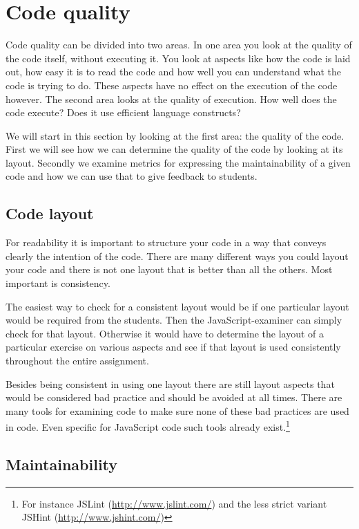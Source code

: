 \documentclass{article}
\begin{document}
\section{Code quality}

Code quality can be divided into two areas. In one area you look at the quality
of the code itself, without executing it. You look at aspects like how the code
is laid out, how easy it is to read the code and how well you can understand
what the code is trying to do. These aspects have no effect on the execution of
the code however. The second area looks at the quality of execution. How well
does the code execute? Does it use efficient language constructs?

We will start in this section by looking at the first area: the quality of the
code. First we will see how we can determine the quality of the code by looking
at its layout. Secondly we examine metrics for expressing the maintainability
of a given code and how we can use that to give feedback to students.

\subsection{Code layout}

For readability it is important to structure your code in a way that conveys clearly the intention of the code. There are many different ways you could layout your code and there is not one layout that is better than all the others. Most important is consistency.

The easiest way to check for a consistent layout would be if one particular layout would be required from the students. Then the JavaScript-examiner can simply check for that layout. Otherwise it would have to determine the layout of a particular exercise on various aspects and see if that layout is used consistently throughout the entire assignment.

Besides being consistent in using one layout there are still layout aspects
that would be considered bad practice and should be avoided at all times. There
are many tools for examining code to make sure none of these bad practices are
used in code. Even specific for JavaScript code such tools already
exist.\footnote{For instance JSLint (\url{http://www.jslint.com/}) and the less
strict variant JSHint (\url{http://www.jshint.com/})}

\subsection{Maintainability}
\end{document}
